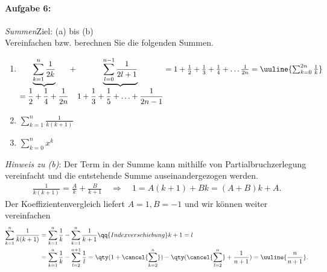 
\paragraph{Aufgabe 6: } \emph{Summen}\hfill Ziel: (a) bis (b)\\[0.2cm]
Vereinfachen bzw. berechnen Sie die folgenden Summen. 

\begin{enumerate}[label=(\alph*), labelindent=1em,labelsep=0.5cm]
    \item $\underbrace{\sum_{k=1}^n \frac{1}{2k}}_{\displaystyle =\frac{1}{2}+\frac{1}{4} + \frac{1}{2n}} + \underbrace{\sum_{l=0}^{n-1} \frac{1}{2l+1}}_{\displaystyle 1+\frac{1}{3}+\frac{1}{5}+\hdots+\frac{1}{2n-1}} = 1 + \frac{1}{2} + \frac{1}{3} + \frac{1}{4} + \hdots \frac{1}{2n} = \uuline{\sum_{k=0}^{2n} \frac{1}{k}}$
    \item $\sum_{k=1}^n \frac{1}{k(k+1)}$
    \item $\sum_{k=0}^n x^k$ 
\end{enumerate}

\emph{Hinweis zu (b)}: Der Term in der Summe kann mithilfe von Partialbruchzerlegung vereinfacht und die entstehende Summe auseinandergezogen werden. 
\begin{align}
    \frac{1}{k(k+1)} = \frac{A}{k} + \frac{B}{k+1} \quad \Rightarrow \quad 1 = A(k+1) + Bk = (A+B) k + A.
\end{align}
Der Koeffizientenvergleich liefert $A=1, B=-1$ und wir können weiter vereinfachen 
\begin{align}
    \sum_{k=1}^n \frac{1}{k(k+1)} &= \sum_{k=1}^n \frac{1}{k} - \sum_{k=1}^n \frac{1}{k+1} \qq{Indexverschiebung} k+1 = l \\
    & =\sum_{k=1}^n \frac{1}{k} - \sum_{l=2}^{n+1} \frac{1}{l} = \qty(1 + \cancel{\sum_{k=2}^n}) - \qty(\cancel{\sum_{l=2}^n} + \frac{1}{n+1}) = \uuline{\frac{n}{n+1}}.
\end{align}

